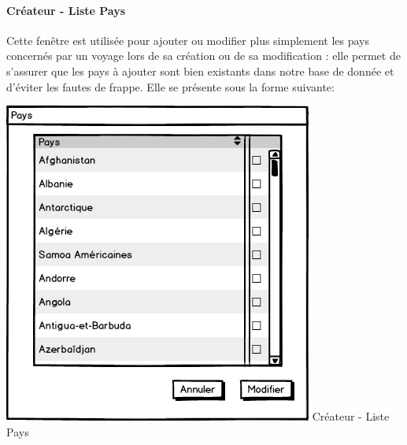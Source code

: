 \documentclass[11pt]{article}
\begin{document}
\paragraph{Créateur - Liste Pays}
Cette fenêtre est utilisée pour ajouter ou modifier plus simplement les pays concernés par un voyage lors de sa création ou de sa modification : elle permet de s'assurer que les pays à ajouter sont bien existants dans notre base de donnée et d’éviter les fautes de frappe. Elle se présente sous la forme suivante:
\begin{center}
\includegraphics[scale = 0.45]{../Conception_graphique/png_Pour_CR/Createur-40-Liste_Pays.png}
\newline
Créateur - Liste Pays
\label{fig:Cr-Liste Pays}
\end{center}
\end{document}
